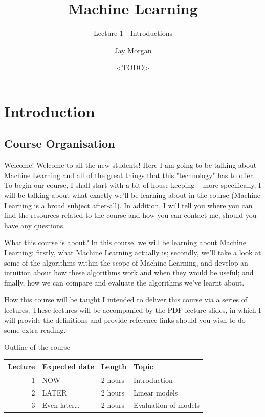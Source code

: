 \documentclass[10pt]{beamer}
\author{Jay Morgan}
\date{<TODO>}
\title{Machine Learning}
\subtitle{Lecture 1 - Introductions}
\begin{document}
\maketitle

\section*{Introduction}
\label{sec:org9a86c78}

\subsection*{Course Organisation}
\label{sec:org5a55afb}

\begin{frame}[label={sec:orgbbd286c}]{Welcome!}
Welcome to all the new students! Here I am going to be talking about Machine Learning
and all of the great things that this "technology" has to offer. To begin our course,
I shall start with a bit of house keeping -- more specifically, I will be talking
about what exactly we'll be learning about in the course (Machine Learning is a broad
subject after-all). In addition, I will tell you where you can find the resources
related to the course and how you can contact me, should you have any questions.
\end{frame}

\begin{frame}[label={sec:orgbe61ba5}]{What this course is about?}
In this course, we will be learning about Machine Learning: firstly, what Machine
Learning actually is; secondly, we'll take a look at some of the algorithms within
the scope of Machine Learning, and develop an intuition about how these algorithms
work and when they would be useful; and finally, how we can compare and evaluate the
algorithms we've learnt about.
\end{frame}

\begin{frame}[label={sec:orgcc7293e}]{How this course will be taught}
I intended to deliver this course via a series of lectures. These lectures will be
accompanied by the PDF lecture slides, in which I will provide the definitions and
provide reference links should you wish to do some extra reading.
\end{frame}

\begin{frame}[label={sec:org2257a41}]{Outline of the course}
\begin{center}
\begin{tabular}{rlll}
\toprule
Lecture & Expected date & Length & Topic\\
\midrule
1 & NOW & 2 hours & Introduction\\
2 & LATER & 2 hours & Linear models\\
3 & Even later\ldots{} & 2 hours & Evaluation of models\\
\bottomrule
\end{tabular}
\end{center}
\end{frame}
\end{document}
